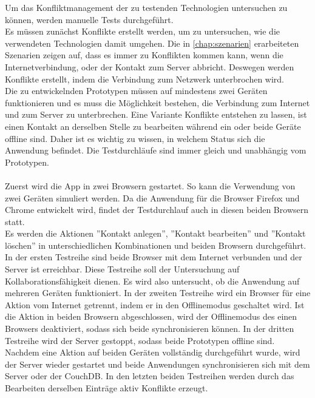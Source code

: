 Um das Konfliktmanagement der zu testenden Technologien untersuchen zu können, werden manuelle Tests durchgeführt.\\
Es müssen zunächst Konflikte erstellt werden, um zu untersuchen, wie die verwendeten Technologien damit umgehen.
Die in \autoref{chap:szenarien} erarbeiteten Szenarien zeigen auf, dass es immer zu Konflikten kommen kann, wenn die Internetverbindung, oder der Kontakt zum Server abbricht.
Deswegen werden Konflikte erstellt, indem die Verbindung zum Netzwerk unterbrochen wird.\\
Die zu entwickelnden Prototypen müssen auf mindestens zwei Geräten funktionieren und es muss die Möglichkeit bestehen, die Verbindung zum Internet und zum Server zu unterbrechen.
Eine Variante Konflikte entstehen zu lassen, ist einen Kontakt an derselben Stelle zu bearbeiten während ein oder beide Geräte offline sind. Daher ist es wichtig zu wissen, in welchem Status sich die Anwendung befindet.
Die Testdurchläufe sind immer gleich und unabhängig vom Prototypen.\\\\
%
%
Zuerst wird die \gls{App} in zwei Browsern gestartet.
So kann die Verwendung von zwei Geräten simuliert werden. Da die Anwendung für die Browser Firefox und Chrome entwickelt wird, findet der Testdurchlauf auch in diesen beiden Browsern statt.\\
Es werden die Aktionen ''Kontakt anlegen'', ''Kontakt bearbeiten'' und ''Kontakt löschen'' in unterschiedlichen Kombinationen und beiden Browsern durchgeführt.
In der ersten Testreihe sind beide Browser mit dem Internet verbunden und der Server ist erreichbar.
Diese Testreihe soll der Untersuchung auf Kollaborationsfähigkeit dienen. Es wird also untersucht, ob die Anwendung auf mehreren Geräten funktioniert.
In der zweiten Testreihe wird ein Browser für eine Aktion vom Internet getrennt, indem er in den Offlinemodus geschaltet wird.
Ist die Aktion in beiden Browsern abgeschlossen, wird der Offlinemodus des einen Browsers deaktiviert, sodass sich beide synchronisieren können.
In der dritten Testreihe wird der Server gestoppt, sodass beide Prototypen offline sind. Nachdem eine Aktion auf beiden Geräten vollständig durchgeführt wurde, wird der Server wieder gestartet und beide Anwendungen synchronisieren sich mit dem Server oder der CouchDB. In den letzten beiden Testreihen werden durch das Bearbeiten derselben Einträge aktiv Konflikte erzeugt.\\
